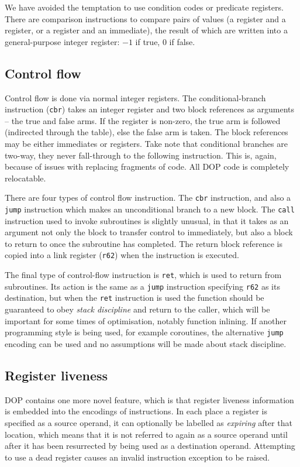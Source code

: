 \documentclass[11pt,letterpaper,twocolumn,notitlepage]{article}
\begin{document}
We have avoided the temptation to use condition codes or predicate registers. There are comparison instructions to compare pairs of values (a register and a register, or a register and an immediate), the result of which are written into a general-purpose integer register: $-1$ if true, $0$ if false.

\subsection{Control flow}

Control flow is done via normal integer registers. The conditional-branch instruction ({\tt cbr}) takes an integer register and two block references as arguments -- the true and false arms. If the register is non-zero, the true arm is followed (indirected through the table), else the false arm is taken. The block references may be either immediates or registers. Take note that conditional branches are two-way, they never fall-through to the following instruction. This is, again, because of issues with replacing fragments of code. All DOP code is completely relocatable.

There are four types of control flow instruction. The {\tt cbr} instruction, and also a {\tt jump} instruction which makes an unconditional branch to a new block. The {\tt call} instruction used to invoke subroutines is slightly unusual, in that it takes as an argument not only the block to transfer control to immediately, but also a block to return to once the subroutine has completed. The return block reference is copied into a link register ({\tt r62}) when the instruction is executed.

The final type of control-flow instruction is {\tt ret}, which is used to return from subroutines. Its action is the same as a {\tt jump} instruction specifying {\tt r62} as its destination, but when the {\tt ret} instruction is used the function should be guaranteed to obey {\em stack discipline} and return to the caller, which will be important for some times of optimisation, notably function inlining. If another programming style is being used, for example coroutines, the alternative {\tt jump} encoding can be used and no assumptions will be made about stack discipline.

\subsection{Register liveness}

DOP contains one more novel feature, which is that register liveness information is embedded into the encodings of instructions. In each place a register is specified as a source operand, it can optionally be labelled as {\em expiring} after that location, which means that it is not referred to again as a source operand until after it has been resurrected by being used as a destination operand. Attempting to use a dead register causes an invalid instruction exception to be raised.
\end{document}
